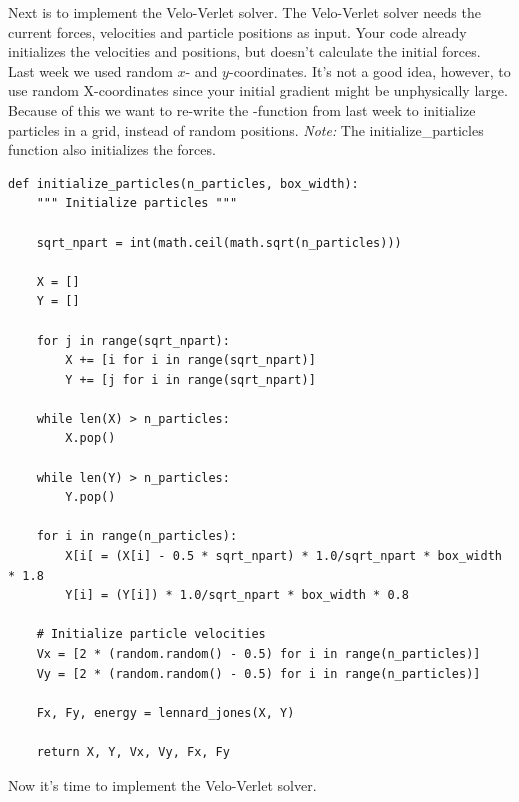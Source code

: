 \documentclass{article}
\begin{document}
\newpage

Next is to implement the Velo-Verlet solver.
The Velo-Verlet solver needs the current forces, velocities and
particle positions as input. Your code already initializes the
velocities and positions, but doesn't calculate the initial forces. \\

Last week we used random $x$- and $y$-coordinates.
It's not a good idea, however, to use random X-coordinates since your initial
gradient might be unphysically large. \\

Because of this we want to re-write the -function
from last week to initialize particles in a grid, instead of random positions.
\textit{Note:} The initialize\_particles function also initializes
the forces.

\begin{lstlisting}
def initialize_particles(n_particles, box_width):
    """ Initialize particles """

    sqrt_npart = int(math.ceil(math.sqrt(n_particles)))

    X = []
    Y = []

    for j in range(sqrt_npart):
        X += [i for i in range(sqrt_npart)]
        Y += [j for i in range(sqrt_npart)]

    while len(X) > n_particles:
        X.pop()

    while len(Y) > n_particles:
        Y.pop()

    for i in range(n_particles):
        X[i[ = (X[i] - 0.5 * sqrt_npart) * 1.0/sqrt_npart * box_width * 1.8
        Y[i] = (Y[i]) * 1.0/sqrt_npart * box_width * 0.8

    # Initialize particle velocities
    Vx = [2 * (random.random() - 0.5) for i in range(n_particles)]
    Vy = [2 * (random.random() - 0.5) for i in range(n_particles)]

    Fx, Fy, energy = lennard_jones(X, Y)

    return X, Y, Vx, Vy, Fx, Fy

\end{lstlisting}


Now it's time to implement the Velo-Verlet solver.
\end{document}

